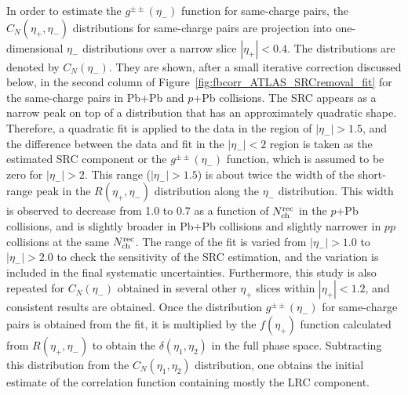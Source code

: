 In order to estimate the $g^{\pm\pm}(\eta_-)$ function for same-charge pairs, the $C_N(\eta_+, \eta_-)$ distributions for same-charge pairs are projection into one-dimensional $\eta_-$ distributions over a narrow slice $|\eta_+|<0.4$. The distributions are denoted by $C_N(\eta_-)$. They are shown, after a small iterative correction discussed below, in the second column of Figure~\ref{fig:fbcorr_ATLAS_SRCremoval_fit} for the same-charge pairs in Pb+Pb and $p$+Pb collisions. The SRC appears as a narrow peak on top of a distribution that has an approximately quadratic shape. Therefore, a quadratic fit is applied to the data in the region of $|\eta_-|>1.5$, and the difference between the data and fit in the $|\eta_-|<2$ region is taken as the estimated SRC component or the $g^{\pm\pm}(\eta_-)$ function, which is assumed to be zero for $|\eta_-|>2$. This range ($|\eta_-|>1.5$) is about twice the width of the short-range peak in the $R(\eta_+, \eta_-)$ distribution along the $\eta_-$ distribution. This width is observed to decrease from 1.0 to 0.7 as a function of $N_\text{ch}^\text{rec}$ in the $p$+Pb collisions, and is slightly broader in Pb+Pb collisions and slightly narrower in $pp$ collisions at the same $N_\text{ch}^\text{rec}$. The range of the fit is varied from $|\eta_-|>1.0$ to $|\eta_-|>2.0$ to check the sensitivity of the SRC estimation, and the variation is included in the final systematic uncertainties. Furthermore, this study is also repeated for $C_N(\eta_-)$ obtained in several other $\eta_+$ slices within $|\eta_+|<1.2$, and consistent results are obtained. Once the distribution $g^{\pm\pm}(\eta_-)$ for same-charge pairs is obtained from the fit, it is multiplied by the $f(\eta_+)$ function calculated from $R(\eta_+, \eta_-)$ to obtain the $\delta(\eta_1, \eta_2)$ in the full phase space. Subtracting this distribution from the $C_N(\eta_1, \eta_2)$ distribution, one obtains the initial estimate of the correlation function containing mostly the LRC component.

